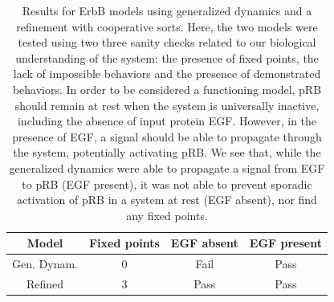 \documentclass{article}
\begin{document}
\begin{table}[h!]
\centering
  \begin{tabular}{|c|c|c|c|}
  \hline
    \textbf{Model} & \textbf{Fixed points} & EGF absent& EGF present \\
  \hline
    Gen. Dynam. & 0 & Fail & Pass \\
  \hline
    Refined & 3 & Pass & Pass \\
  \hline

  \end{tabular}
   \caption{Results for ErbB models using generalized dynamics and a refinement with cooperative sorts. Here, the two models were tested using two three sanity checks related to our biological understanding of the system: the presence of fixed points, the lack of impossible behaviors and the presence of demonstrated behaviors. In order to be considered a functioning model, pRB should remain at rest when the system is universally inactive, including the absence of input protein EGF. However, in the presence of EGF, a signal should be able to propagate through the system, potentially activating pRB. We see that, while the generalized dynamics were able to propagate a signal from EGF to pRB (EGF present), it was not able to prevent sporadic activation of pRB in a system at rest (EGF absent), nor find any fixed points.}
   \label{egf}

\end{table}
\end{document}
